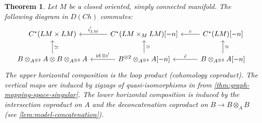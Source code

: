 \documentclass{scrartcl}
\theoremstyle{plain}
\newtheorem{theorem}{Theorem}[section]
\theoremstyle{definition}
\newcommand{\quiso}{\simeq}
\DeclareMathOperator{\id}{id}
\begin{document}
\begin{theorem}\label{thm:loop-product-derived}
    Let $M$ be a closed oriented, simply connected manifold. 
    The following diagram in $D(Ch)$ commutes:
    \begin{equation}\label{diag:loop-product-derived}
    \begin{tikzcd}
        C^*(LM\times LM) & \lar[swap, "i^!_{LM}"] C^*(LM\times_M LM)[-n] & \lar[swap, "c"] C^*(LM)[-n] \\
        B\otimes_{A^{\otimes 2}} A\otimes B\otimes_{A^{\otimes 2}} A \uar[swap, "\quiso"] & \lar[swap, "\id\otimes i^!"] B^{\otimes 2}\otimes_{A^{\otimes 4}} A[-n]\uar[swap, "\quiso"] & B\otimes_{A^{\otimes 2}} A[-n] \lar[swap, "\bar c"]\uar[swap, "\quiso"]
    \end{tikzcd}
    \end{equation}
    The upper horizontal composition is the loop product (cohomology coproduct). The vertical maps are induced by zigzags of quasi-isomorphisms in from \cref{thm:graph-mapping-space-singular}. The lower horizontal composition is induced by the intersection coproduct on $A$ and the deconcatenation coproduct on $B\to B\otimes_A B$ (see \cref{lem:model-concatenation}).
\end{theorem}
\end{document}

